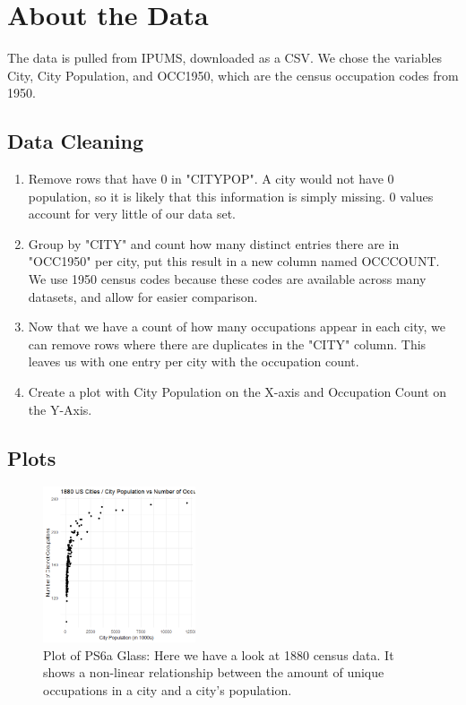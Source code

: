 \documentclass{article}
\begin{document}
\section{About the Data}
The data is pulled from IPUMS, downloaded as a CSV. We chose the variables City, City Population, and OCC1950, which are the census occupation codes from 1950.

\subsection{Data Cleaning}
\begin{enumerate}
    \item Remove rows that have 0 in "CITYPOP". A city would not have 0 population, so it is likely that this information is simply missing. 0 values account for very little of our data set.
    \item Group by "CITY" and count how many distinct entries there are in "OCC1950" per city, put this result in a new column named OCCCOUNT. We use 1950 census codes because these codes are available across many datasets, and allow for easier comparison.
    \item Now that we have a count of how many occupations appear in each city, we can remove rows where there are duplicates in the "CITY" column. This leaves us with one entry per city with the occupation count.
    \item Create a plot with City Population on the X-axis and Occupation Count on the Y-Axis.
\end{enumerate}

\subsection{Plots}
\begin{figure}[h]
    \centering
    \includegraphics[width=0.4\textwidth]{PS6a_Glass.png}
    \caption{Plot of PS6a Glass: Here we have a look at 1880 census data. It shows a non-linear relationship between the amount of unique occupations in a city and a city's population.}
    \label{fig:PS6a_Glass}
\end{figure}
\end{document}
